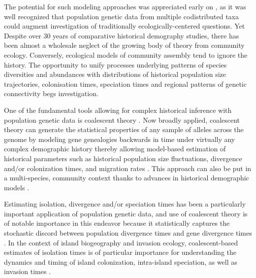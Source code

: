 \documentclass[12pt]{article}
\begin{document}
The potential for such
modeling approaches was appreciated early on \citep{Avise1987-vx,
  Avise1998-th}, as it was well recognized that population genetic
data from multiple codistributed taxa could augment investigation of
traditionally ecologically-centered questions. Yet Despite over 30 years of
comparative historical demography studies, there has been almost a
wholesale neglect of the growing body of theory from community
ecology. Conversely, ecological models of community assembly tend to
ignore the history.  The opportunity to unify processes
underlying patterns of species diversities and abundances with
distributions of historical population size trajectories, colonisation
times, speciation times and regional patterns of genetic connectivity
begs investigation. 



One of the fundamental tools allowing for complex historical inference
with population genetic data is coalescent theory
\citep{Hudson1983-hx, Tajima1983-me, Kingman1982-uf, Kingman1982-ie,
  Rosenberg2002-ag}.  Now broadly applied, coalescent theory can
generate the statistical properties of any sample of alleles across
the genome by modeling gene genealogies backwards in time under
virtually any complex demographic history thereby allowing model-based
estimation of historical parameters such as historical population size
fluctuations, divergence and/or colonization times, and migration
rates \citep{Wakeley2008-se}. This approach can also be put in a
multi-species, community context thanks to advances in historical
demographic models \citep{Xue2015-el,
  Hickerson2006-uf,Carstens2016-mc, Chan2014-nq, Satler2016-lb}.

Estimating isolation, divergence and/or speciation times has been a
particularly important application of population genetic data, and use
of coalescent theory is of notable importance in this endeavor because
it statistically captures the stochastic discord between population
divergence times and gene divergence times \citep{Charlesworth2010-hn,
  Edwards2000-cs}. 
%
%
In the context of island biogeography and invasion
ecology, coalescent-based estimates of isolation times is of
particular importance for understanding the dynamics and timing of
island colonization, intra-island speciation, as well as invasion
times \citep{Estoup2003-ny, Estoup2004-cy, Hickerson2008-da,
  Gray2014-kp}.
\end{document}
